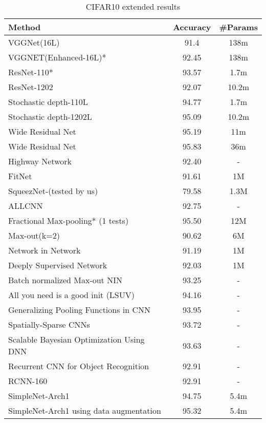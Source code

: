 \documentclass{article} \usepackage{lets_keepit_simple,times}
\begin{document}
\begin{table}[H]
\caption{CIFAR10 extended results}\label{tab:cifar10_appndx}
\begin{center}
\begin{tabular}{lcc}
\textbf{Method} & \textbf{Accuracy} & \textbf{\#Params}\\ \hline
VGGNet(16L)\cite{Sergey_CIFAR10_OnTorch_2015}  & 91.4  & 138m\\
VGGNET(Enhanced-16L)\cite{Sergey_CIFAR10_OnTorch_2015}* & 92.45	& 138m\\
ResNet-110\cite{He_ResNet_2015}* & 93.57 & 1.7m\\
ResNet-1202\cite{He_ResNet_2015} & 92.07 & 10.2m\\
Stochastic depth-110L\cite{Huang_DeepNN_StochDepth_2016} & 94.77 & 1.7m \\
Stochastic depth-1202L\cite{Huang_DeepNN_StochDepth_2016} & 95.09 & 10.2m \\
Wide Residual Net\cite{Zagoruyko_WRN_2016} & 95.19 & 11m \\
Wide Residual Net\cite{Zagoruyko_WRN_2016} & 95.83 & 36m \\
Highway Network\cite{Srivastava_HighwayNets_2015} & 92.40 & - \\
FitNet\cite{Romero_Fitnet_2014} & 91.61 & 1M \\
SqueezNet\cite{Iandola_squeezenet_2016}-(tested by us) & 79.58 & 1.3M \\
ALLCNN\cite{Springenberg_StrivingForSimplicity_2014} & 92.75 & - \\
Fractional Max-pooling* (1 tests)\cite{Graham_FractionalMaxpooling_2014} & 95.50 & 12M \\
Max-out(k=2)\cite{Goodfellow_MaxoutNetwork_2013} & 90.62 & 6M \\
Network in Network\cite{Lin_NIN_2013} & 91.19 & 1M \\
Deeply Supervised Network\cite{Lee_DeeplySupervisedNet_2015} & 92.03 & 1M \\
Batch normalized Max-out NIN\cite{JiaRen_BatchNormMaxoutNIN_2015} & 93.25 & - \\
All you need is a good init (LSUV)\cite{Mishkin_AllYouNeedIsGoodInit_2016} & 94.16 & - \\
Generalizing Pooling Functions in CNN\cite{Lee_CNN_Mixed_gated_2016} & 93.95 & - \\
Spatially-Sparse CNNs\cite{Graham_Spatilly_sparse_CNN_2014} & 93.72 & - \\
\small{Scalable Bayesian Optimization Using DNN}\cite{Snoek_ScalableBayesianoptemiz_2015} & 93.63 & - \\
Recurrent CNN for Object Recognition\cite{Liang_RecurrentCNN_2015} & 92.91 & - \\
RCNN-160\cite{Liang_RecurrentCNN_2015} & 92.91 & - \\
SimpleNet-Arch1 & 94.75 & 5.4m \\
SimpleNet-Arch1 using data augmentation & 95.32 & 5.4m \\ \hline
\end{tabular}
\end{center}
\end{table}
\end{document}
